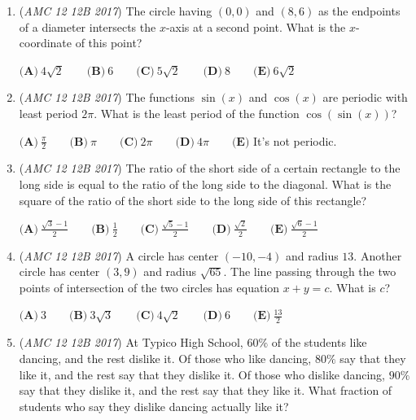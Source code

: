 \begin{enumerate}
 $\textbf{(A)}\ 0\qquad\textbf{(B)}\ 1\qquad\textbf{(C)}\ 2\qquad\textbf{(D)}\ 3\qquad\textbf{(E)}\ 4$


	\item (\textit{AMC 12 12B 2017}) The circle having $(0,0)$ and $(8,6)$ as the endpoints of a diameter intersects the $x$-axis at a second point. What is the $x$-coordinate of this point? 


 $\textbf{(A)}\ 4\sqrt{2} \qquad \textbf{(B)}\ 6\qquad \textbf{(C)}\ 5\sqrt{2}\qquad \textbf{(D)}\ 8\qquad \textbf{(E)}\ 6\sqrt{2}$


	\item (\textit{AMC 12 12B 2017}) The functions $\sin(x)$ and $\cos(x)$ are periodic with least period $2\pi$. What is the least period of the function $\cos(\sin(x))$?


 $\textbf{(A)}\ \frac{\pi}{2}\qquad\textbf{(B)}\ \pi\qquad\textbf{(C)}\ 2\pi \qquad\textbf{(D)}\ 4\pi \qquad\textbf{(E)}$ It's not periodic.


 

	\item (\textit{AMC 12 12B 2017}) The ratio of the short side of a certain rectangle to the long side is equal to the ratio of the long side to the diagonal. What is the square of the ratio of the short side to the long side of this rectangle?


 $\textbf{(A)}\ \frac{\sqrt{3}-1}{2}\qquad\textbf{(B)}\ \frac{1}{2}\qquad\textbf{(C)}\ \frac{\sqrt{5}-1}{2} \qquad\textbf{(D)}\ \frac{\sqrt{2}}{2} \qquad\textbf{(E)}\ \frac{\sqrt{6}-1}{2}$


	\item (\textit{AMC 12 12B 2017}) A circle has center $(-10,-4)$ and radius $13$. Another circle has center $(3,9)$ and radius $\sqrt{65}$. The line passing through the two points of intersection of the two circles has equation $x + y = c$. What is $c$?


 $\textbf{(A)}\ 3\qquad\textbf{(B)}\ 3\sqrt{3}\qquad\textbf{(C)}\ 4\sqrt{2}\qquad\textbf{(D)}\ 6\qquad\textbf{(E)}\ \frac{13}{2}$


	\item (\textit{AMC 12 12B 2017}) At Typico High School, $60\%$ of the students like dancing, and the rest dislike it. Of those who like dancing, $80\%$ say that they like it, and the rest say that they dislike it. Of those who dislike dancing, $90\%$ say that they dislike it, and the rest say that they like it. What fraction of students who say they dislike dancing actually like it?



\end{enumerate}
